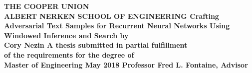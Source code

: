 {
\centering
\large\bf
THE COOPER UNION\\
ALBERT NERKEN SCHOOL OF ENGINEERING
\Large
\vskip 72pt
Crafting Adversarial Text Samples for Recurrent Neural Networks Using Windowed Inference and Search
\vskip 72pt
by\\
Cory Nezin
\vskip 72pt
A thesis submitted in partial fulfillment\\
of the requirements for the degree of\\
Master of Engineering
\vskip 72pt
May 2018
\vskip 72pt
Professor Fred L. Fontaine, Advisor

}
